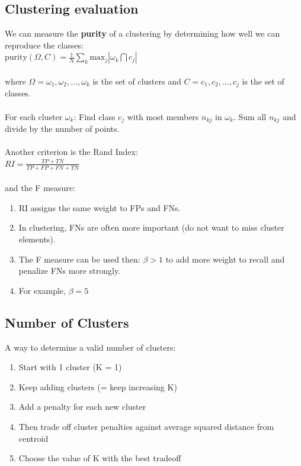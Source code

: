 \documentclass{article}%
\begin{document}
\begin{enumerate}
\begin{enumerate}
\begin{enumerate}
\begin{enumerate}
\subsection*{Clustering evaluation}
We can measure the \textbf{purity} of a clustering by determining how well we can reproduce the classes:\\

$\textrm{purity}(\Omega, C) = \frac{1}{N} \sum \limits_{k} \textrm{max}_j | \omega_k \bigcap c_j |$\\
\\
where $\Omega = { \omega_1, \omega_2, \ldots, \omega_k}$ is the set of clusters and $C = {c_1, c_2, \ldots, c_j}$ is the
set of classes.\\
\\
For each cluster $\omega_k$: Find class $c_j$ with most members $n_{kj}$ in $\omega_k$. Sum all $n_{kj}$ and divide by
the number of points.\\
\vspace{2mm} \\
Another criterion is the Rand Index:\\

$RI = \frac{TP + TN}{TP + FP + FN + TN}$\\
\\
and the F measure:
\begin{enumerate}
    \item RI assigns the same weight to FPs and FNs.
    \item In clustering, FNs are often more important (do not want to miss cluster elements).
    \item The F measure can be used then: $\beta > 1$ to add more weight to recall and penalize FNs more strongly.
    \item For example, $\beta = 5$
\end{enumerate}

\subsection*{Number of Clusters}
A way to determine a valid number of clusters:
\begin{enumerate}
    \item Start with 1 cluster (K = 1)
    \item Keep adding clusters (= keep increasing K)
    \item Add a penalty for each new cluster
    \item Then trade off cluster penalties against average squared distance from centroid
    \item Choose the value of K with the best tradeoff
\end{enumerate}

\end{enumerate}
\end{enumerate}
\end{enumerate}
\end{enumerate}
\end{document}
